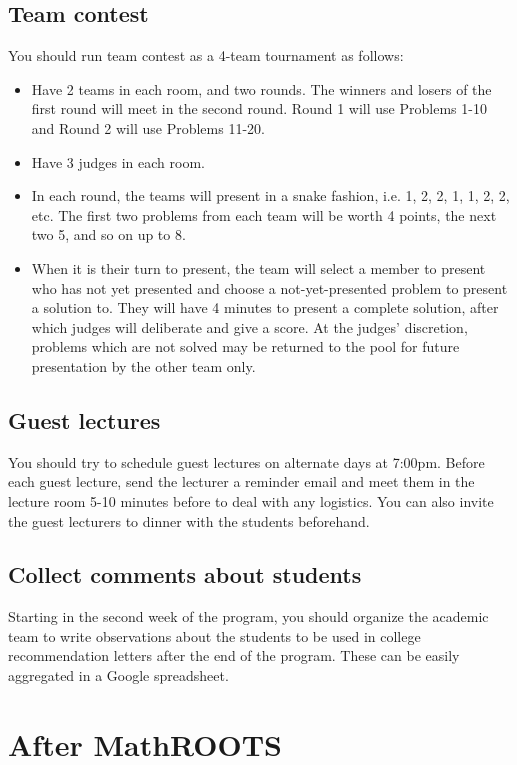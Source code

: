\documentclass[10pt]{amsart}
\begin{document}
\subsection{Team contest}

You should run team contest as a 4-team tournament as follows:
\begin{itemize}
\item Have 2 teams in each room, and two rounds.  The winners and losers of the first round will meet in the second round.  Round 1 will use Problems 1-10 and Round 2 will use Problems 11-20.
\item Have 3 judges in each room.
\item In each round, the teams will present in a snake fashion, i.e. 1, 2, 2, 1, 1, 2, 2, etc.  The first two problems from each team will be worth 4 points, the next two 5, and so on up to 8.
\item When it is their turn to present, the team will select a member to present who has not yet presented and choose a not-yet-presented problem to present a solution to.  They will have 4 minutes to present a complete solution, after which judges will deliberate and give a score.  At the judges' discretion, problems which are not solved may be returned to the pool for future presentation by the other team only.
\end{itemize}

\subsection{Guest lectures}

You should try to schedule guest lectures on alternate days at 7:00pm.  Before each guest lecture, send the lecturer a reminder email and meet them in the lecture room 5-10 minutes before to deal with any logistics.  You can also invite the guest lecturers to dinner with the students beforehand.

\subsection{Collect comments about students}

Starting in the second week of the program, you should organize the academic team to write observations about the students to be used in college recommendation letters after the end of the program.  These can be easily aggregated in a Google spreadsheet.

\section{After MathROOTS}
\end{document}
